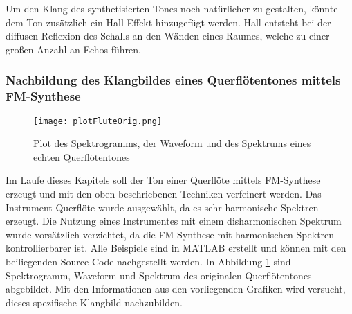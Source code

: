 Um den Klang des synthetisierten Tones noch natürlicher zu gestalten, könnte dem Ton zusätzlich ein Hall-Effekt hinzugefügt werden. Hall entsteht bei der diffusen Reflexion des Schalls an den Wänden eines Raumes, welche zu einer großen Anzahl an Echos führen. \cite[S. 108]{stotz}


\FloatBarrier
\subsubsection{Nachbildung des Klangbildes eines Querflötentones mittels FM-Synthese}

\begin{figure} [h!t!b!]
\centering
  \texttt{[image: plotFluteOrig.png]}
\caption{Plot des Spektrogramms, der Waveform und des Spektrums eines echten Querflötentones}
\label{fig:plotFluteOrig}
\end{figure}

Im Laufe dieses Kapitels soll der Ton einer Querflöte mittels FM-Synthese erzeugt und mit den oben beschriebenen Techniken verfeinert werden. Das Instrument Querflöte wurde ausgewählt, da es sehr harmonische Spektren erzeugt. Die Nutzung eines Instrumentes mit einem disharmonischen Spektrum wurde vorsätzlich verzichtet, da die FM-Synthese mit harmonischen Spektren kontrollierbarer ist. Alle Beispiele sind in MATLAB erstellt und können mit den beiliegenden Source-Code nachgestellt werden. In Abbildung \ref{fig:plotFluteOrig} sind Spektrogramm, Waveform und Spektrum des originalen Querflötentones abgebildet. Mit den Informationen aus den vorliegenden Grafiken wird versucht, dieses spezifische Klangbild nachzubilden.

